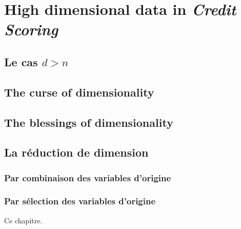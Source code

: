 \chapter{High dimensional data in \textit{Credit Scoring}} \label{chap7}


\section{Le cas $d > n$}


\section{The curse of dimensionality}


\section{The blessings of dimensionality}


\section{La réduction de dimension}


\subsection{Par combinaison des variables d'origine}

\subsection{Par sélection des variables d'origine}


\bigskip

Ce chapitre.


\printbibliography[heading=subbibliography, title=Références du chapitre 6]
